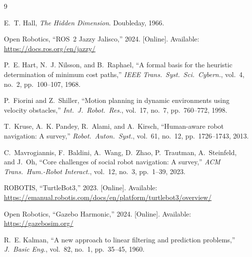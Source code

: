 \documentclass[a4paper]{article}
\begin{document}
\begin{thebibliography}{9}

E.~T. Hall, \textit{The Hidden Dimension}. Doubleday, 1966.

Open Robotics, ``ROS~2 Jazzy Jalisco,'' 2024. [Online]. Available: \url{https://docs.ros.org/en/jazzy/}

P.~E. Hart, N.~J. Nilsson, and B.~Raphael, ``A formal basis for the heuristic determination of minimum cost paths,'' \textit{IEEE Trans.\ Syst.\ Sci.\ Cybern.}, vol.~4, no.~2, pp.~100--107, 1968.

P.~Fiorini and Z.~Shiller, ``Motion planning in dynamic environments using velocity obstacles,'' \textit{Int.\ J.\ Robot.\ Res.}, vol.~17, no.~7, pp.~760--772, 1998.

T.~Kruse, A.~K. Pandey, R.~Alami, and A.~Kirsch, ``Human-aware robot navigation: A survey,'' \textit{Robot.\ Auton.\ Syst.}, vol.~61, no.~12, pp.~1726--1743, 2013.

C.~Mavrogiannis, F.~Baldini, A.~Wang, D.~Zhao, P.~Trautman, A.~Steinfeld, and J.~Oh, ``Core challenges of social robot navigation: A survey,'' \textit{ACM Trans.\ Hum.-Robot Interact.}, vol.~12, no.~3, pp.~1--39, 2023.

ROBOTIS, ``TurtleBot3,'' 2023. [Online]. Available: \url{https://emanual.robotis.com/docs/en/platform/turtlebot3/overview/}

Open Robotics, ``Gazebo Harmonic,'' 2024. [Online]. Available: \url{https://gazebosim.org/}

R.~E. Kalman, ``A new approach to linear filtering and prediction problems,'' \textit{J.\ Basic Eng.}, vol.~82, no.~1, pp.~35--45, 1960.

\end{thebibliography}
\end{document}
